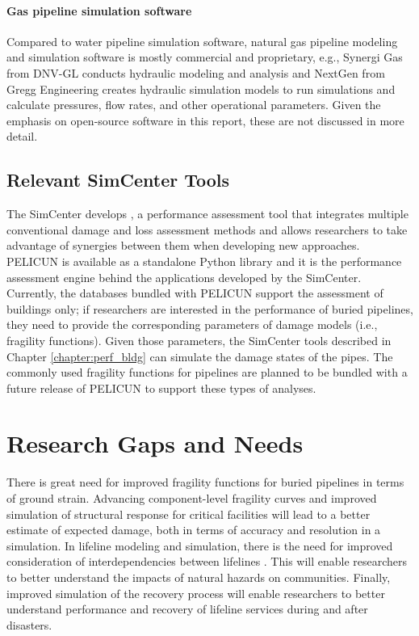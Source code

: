 \paragraph{Gas pipeline simulation software} Compared to water pipeline simulation software, natural gas pipeline modeling and simulation software is mostly commercial and proprietary, e.g., Synergi Gas from DNV-GL conducts hydraulic modeling and analysis and NextGen from Gregg Engineering creates hydraulic simulation models to run simulations and calculate pressures, flow rates, and other operational parameters. Given the emphasis on open-source software in this report, these are not discussed in more detail.

\subsection{Relevant SimCenter Tools}

The SimCenter develops , a performance assessment tool that integrates multiple conventional damage and loss assessment methods and allows researchers to take advantage of synergies between them when developing new approaches. PELICUN is available as a standalone Python library and it is the performance assessment engine behind the applications developed by the SimCenter. Currently, the databases bundled with PELICUN support the assessment of buildings only; if researchers are interested in the performance of buried pipelines, they need to provide the corresponding parameters of damage models (i.e., fragility functions). Given those parameters, the SimCenter tools described in Chapter \ref{chapter:perf_bldg} can simulate the damage states of the pipes. The commonly used fragility functions for pipelines are planned to be bundled with a future release of PELICUN to support these types of analyses.

\section{Research Gaps and Needs}
\label{sec:perf_pipeline_gaps}

There is great need for improved fragility functions for buried pipelines in terms of ground strain. Advancing component-level fragility curves and improved simulation of structural response for critical facilities will lead to a better estimate of expected damage, both in terms of accuracy and resolution in a simulation. In lifeline modeling and simulation, there is the need for improved consideration of interdependencies between lifelines \citep{duenas-osorio2007seismic, johansen2018probabilistic}. This will enable researchers to better understand the impacts of natural hazards on communities. Finally, improved simulation of the recovery process \citep{tabucchi2010simulation, he2019disaster, tomar2020hindcasting} will enable researchers to better understand performance and recovery of lifeline services during and after disasters.

